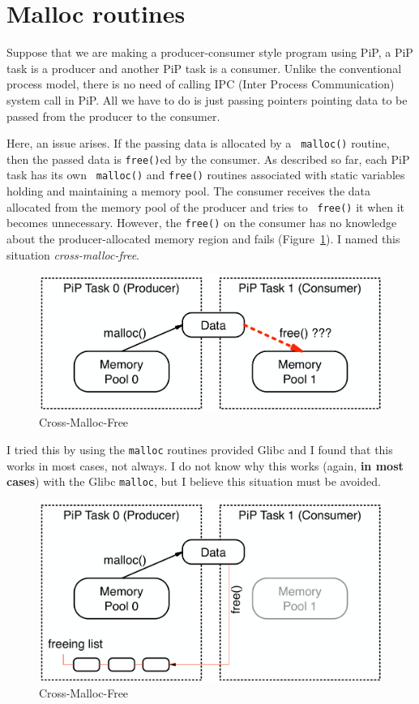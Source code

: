 
\section{Malloc routines}\label{sec:malloc}

Suppose that we are making a producer-consumer style program using PiP,
a PiP task is a producer and another PiP task is a consumer. Unlike the
conventional process model, there is no need of calling IPC (Inter
Process Communication) system call in PiP. All we have to do is just
passing pointers pointing data to be passed from the producer to the
consumer.

Here, an issue arises. If the passing data is allocated by a {\tt
  malloc()} routine, then the passed data is {\tt free()}ed by
the consumer. As described so far, each PiP task has its own {\tt
  malloc()} and {\tt free()} routines associated with static variables
holding and maintaining a memory pool. The consumer receives the data
allocated from the memory pool of the producer and tries to {\tt
  free()} it when it becomes unnecessary. However, the {\tt free()} on
the consumer has no knowledge about the producer-allocated memory
region and fails (Figure~\ref{fig:cross-malloc-free-issue}). I named
this situation {\it cross-malloc-free}. 

\begin{figure}[ht]
\centering
\includegraphics[width=0.7\columnwidth]{malloc/Figs/ProducerConsumer.pdf}
\caption{Cross-Malloc-Free}
\label{fig:cross-malloc-free-issue}
\end{figure}

I tried this by using the {\tt malloc} routines provided Glibc and I
found that this works in most cases, not always. I do not know why
this works (again, {\bf in most cases}) with the Glibc {\tt malloc},
but I believe this situation must be avoided.

\begin{figure}[ht]
\centering
\includegraphics[width=0.7\columnwidth]{malloc/Figs/CrossMallocFree.pdf}
\caption{Cross-Malloc-Free}
\label{fig:cross-malloc-free}
\end{figure}


